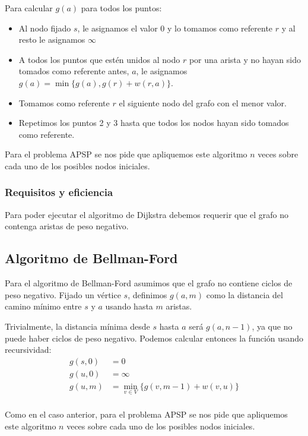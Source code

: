\documentclass[a4paper, 11pt]{article} %
\begin{document}
    Para calcular $g(a)$ para todos los puntos:
    \begin{itemize}
      \item Al nodo fijado $s$, le asignamos el valor 0 y lo tomamos como referente $r$ y al resto le asignamos $\infty$
      \item A todos los puntos que estén unidos al nodo $r$  por una
      arista y no hayan sido tomados como referente antes, $a$, le asignamos $g(a) = \min \{g(a), g(r) + w(r,a)\}$.
      \item Tomamos como referente $r$ el siguiente nodo del grafo con el menor valor.
      \item Repetimos los puntos 2 y 3 hasta que todos los nodos hayan sido tomados como referente.
    \end{itemize}
    
    Para el problema APSP se nos pide que apliquemos este algoritmo $n$ veces sobre cada uno
    de los posibles nodos iniciales.
  
    \subsubsection{Requisitos y eficiencia}
      Para poder ejecutar el algoritmo de Dijkstra debemos requerir que el grafo
      no contenga aristas de peso negativo.

  \subsection{Algoritmo de Bellman-Ford}
    Para el algoritmo de Bellman-Ford asumimos que el grafo no contiene ciclos de peso negativo.
    Fijado un vértice $s$, definimos $g(a,m)$ como la distancia del camino mínimo entre $s$ y $a$
    usando hasta $m$ aristas.
    
    Trivialmente, la distancia mínima desde $s$ hasta $a$ será $g(a,n-1)$, ya que no puede
    haber ciclos de peso negativo. Podemos calcular entonces la función usando recursividad:
    \begin{equation} 
      \begin{split}
	g(s,0)  &=  0 \\
	g(u,0)  &=  \infty \\
	g(u,m)  &=  \min_{v \in V} \{g(v,m-1) + w(v,u)\} \\
      \end{split} 
    \end{equation}

    Como en el caso anterior, para el problema APSP se nos pide que apliquemos este algoritmo $n$ veces sobre cada uno
    de los posibles nodos iniciales.
  
\end{document}
